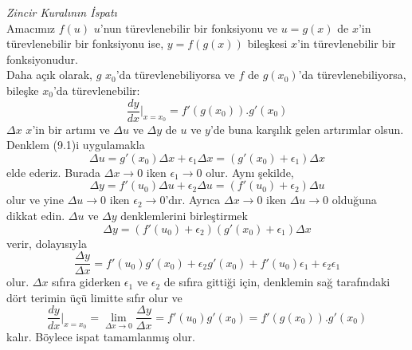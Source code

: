 \begin{ispat}\textit{Zincir Kuralının İspatı}\\
Amacımız $f(u)$ $u$'nun türevlenebilir bir fonksiyonu ve $u=g(x)$ de $x$'in türevlenebilir bir fonksiyonu ise, $y=f(g(x))$ bileşkesi $x$'in türevlenebilir bir fonksiyonudur.\\
	Daha açık olarak, $g$ $x_0$'da türevlenebiliyorsa ve $f$ de $g(x_0)$'da türevlenebiliyorsa, bileşke $x_0$'da türevlenebilir:
	\begin{equation*}
	\frac{dy}{dx}|_{x=x_0}=f'(g(x_0)).g'(x_0)
	\end{equation*}
$\varDelta x$ $x$'in bir artımı ve $\varDelta u$ ve $\varDelta y$ de $u$ ve $y$'de buna karşılık gelen artırımlar olsun. Denklem (9.1)i uygulamakla
	\begin{equation*}
	\varDelta u=g'(x_0) \varDelta x + \epsilon_1 \varDelta x=(g'(x_0)+\epsilon_1)\varDelta x
	\end{equation*}
elde ederiz. Burada $\varDelta x \rightarrow 0$ iken $\epsilon_1 \rightarrow 0$ olur. Aynı şekilde,
	\begin{equation*}
	\varDelta y=f'(u_0) \varDelta u + \epsilon_2 \varDelta u =(f'(u_0)+\epsilon_2)\varDelta u
	\end{equation*}
olur ve yine $\varDelta u \rightarrow 0$ iken $\epsilon_2 \rightarrow 0$'dır. Ayrıca $\varDelta x \rightarrow 0$ iken $\varDelta u \rightarrow 0$ olduğuna dikkat edin. $\varDelta u$ ve $\varDelta y$ denklemlerini birleştirmek\\
	\begin{equation*}
	\varDelta y=(f'(u_0)+\epsilon_2)(g'(x_0)+\epsilon_1)\varDelta x
	\end{equation*}
verir, dolayısıyla
	\begin{equation*}
	\frac{\varDelta y}{\varDelta x}=f'(u_0)g'(x_0)+\epsilon_2 g'(x_0)+f'(u_0)\epsilon_1+\epsilon_2\epsilon_1
	\end{equation*}
olur. $\varDelta x$ sıfıra giderken $\epsilon_1$ ve $\epsilon_2$ de sıfıra gittiği için, denklemin sağ tarafındaki dört terimin üçü limitte sıfır olur ve
	\begin{equation*}
	\frac{dy}{dx}|_{x=x_0}=\lim_{\varDelta x \rightarrow 0} \frac{\varDelta y}{\varDelta x}=f'(u_0)g'(x_0)=f'(g(x_0)).g'(x_0)
	\end{equation*}
kalır. Böylece ispat tamamlanmış olur.
\end{ispat}
